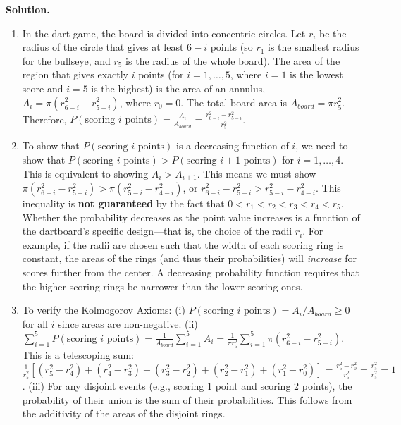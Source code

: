 \noindent\textbf{Solution.}
\begin{enumerate}[label=(\alph*)]
    \item In the dart game, the board is divided into concentric circles. Let $r_i$ be the radius of the circle that gives at least $6-i$ points (so $r_1$ is the smallest radius for the bullseye, and $r_5$ is the radius of the whole board). The area of the region that gives exactly $i$ points (for $i=1, \ldots, 5$, where $i=1$ is the lowest score and $i=5$ is the highest) is the area of an annulus, $A_i = \pi(r_{6-i}^2 - r_{5-i}^2)$, where $r_0 = 0$.
    \vspace{1ex} %
    The total board area is $A_{board} = \pi r_5^2$.
    \vspace{1ex} %
    Therefore, $P(\text{scoring } i \text{ points}) = \frac{A_i}{A_{board}} = \frac{r_{6-i}^2 - r_{5-i}^2}{r_5^2}$.
    \vspace{1ex} %
    \item To show that $P(\text{scoring } i \text{ points})$ is a decreasing function of $i$, we need to show that $P(\text{scoring } i \text{ points}) > P(\text{scoring } i+1 \text{ points})$ for $i=1, \ldots, 4$. This is equivalent to showing $A_i > A_{i+1}$.
    \vspace{1ex} %
    This means we must show $\pi(r_{6-i}^2 - r_{5-i}^2) > \pi(r_{5-i}^2 - r_{4-i}^2)$, or $r_{6-i}^2 - r_{5-i}^2 > r_{5-i}^2 - r_{4-i}^2$.
    \vspace{1ex} %
    This inequality is \textbf{not guaranteed} by the fact that $0 < r_1 < r_2 < r_3 < r_4 < r_5$. Whether the probability decreases as the point value increases is a function of the dartboard's specific design---that is, the choice of the radii $r_i$. For example, if the radii are chosen such that the width of each scoring ring is constant, the areas of the rings (and thus their probabilities) will \textit{increase} for scores further from the center. A decreasing probability function requires that the higher-scoring rings be narrower than the lower-scoring ones.
    \vspace{1ex} %
    \item To verify the Kolmogorov Axioms:
    \vspace{1ex} %
    (i) $P(\text{scoring } i \text{ points}) = A_i/A_{board} \geq 0$ for all $i$ since areas are non-negative.
    \vspace{1ex} %
    (ii) $\sum_{i=1}^5 P(\text{scoring } i \text{ points}) = \frac{1}{A_{board}} \sum_{i=1}^5 A_i = \frac{1}{\pi r_5^2} \sum_{i=1}^5 \pi(r_{6-i}^2 - r_{5-i}^2)$. This is a telescoping sum:
    \vspace{1ex} %
    $\frac{1}{r_5^2} [ (r_5^2-r_4^2) + (r_4^2-r_3^2) + (r_3^2-r_2^2) + (r_2^2-r_1^2) + (r_1^2-r_0^2) ] = \frac{r_5^2 - r_0^2}{r_5^2} = \frac{r_5^2}{r_5^2} = 1$.
    \vspace{1ex} %
    (iii) For any disjoint events (e.g., scoring 1 point and scoring 2 points), the probability of their union is the sum of their probabilities. This follows from the additivity of the areas of the disjoint rings.
\end{enumerate}


